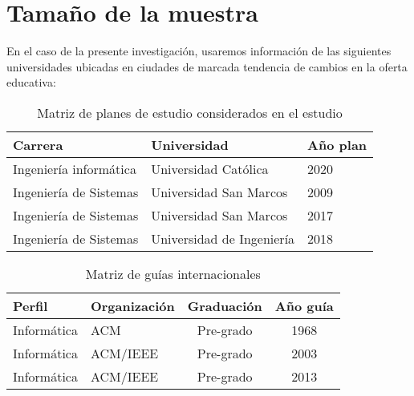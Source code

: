 \section{Tamaño de la muestra}

En el caso de la presente investigación, usaremos información de las siguientes universidades ubicadas en ciudades de marcada tendencia de cambios en la oferta educativa:

\begin{table}[h]
\centering
\caption{Matriz de planes de estudio considerados en el estudio}
\begin{tabular}[t]{lll}
\hline
Carrera & Universidad &  Año plan\\
\hline
Ingeniería informática & Universidad Católica & 2020\\%
Ingeniería de Sistemas&Universidad San Marcos&2009\\%
Ingeniería de Sistemas&Universidad San Marcos&2017\\%
Ingeniería de Sistemas&Universidad de Ingeniería&2018\\%
\hline
\end{tabular}
\label{tab:tabunis}
\end{table}


\begin{table}[h]
\centering
\caption{Matriz de guías internacionales}
\begin{tabular}[t]{llcc}
\hline
Perfil&Organización&Graduación&Año guía\\
\hline
Informática&ACM&Pre-grado&1968\\%
Informática&ACM/IEEE&Pre-grado&2003\\%
Informática&ACM/IEEE&Pre-grado&2013\\%
\hline
\end{tabular}
\label{tab:tabperfil}
\end{table}


